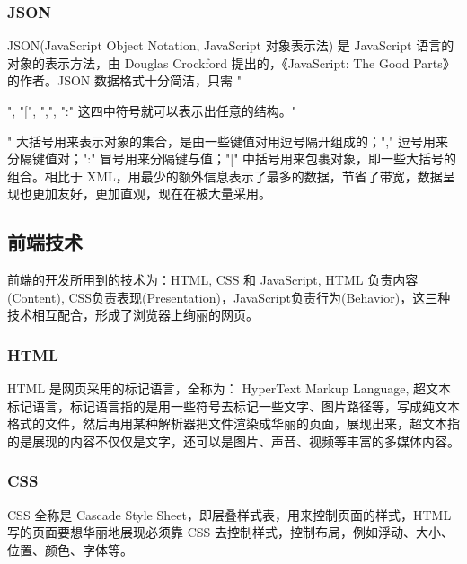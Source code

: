 \documentclass[UTF8]{ctexbook}
\begin{document}
            \subsubsection{JSON}
              \label{subsubsec:JSON}
                JSON(JavaScript Object Notation, JavaScript 对象表示法) 是 JavaScript 语言的对象的表示方法，由 Douglas Crockford 提出的，《JavaScript: The Good Parts》的作者。JSON 数据格式十分简洁，只需 "{", "[", ",", ":" 这四中符号就可以表示出任意的结构。"{" 大括号用来表示对象的集合，是由一些键值对用逗号隔开组成的；"," 逗号用来分隔键值对；":" 冒号用来分隔键与值；"[" 中括号用来包裹对象，即一些大括号的组合。相比于 XML，用最少的额外信息表示了最多的数据，节省了带宽，数据呈现也更加友好，更加直观，现在在被大量采用。

        \subsection{前端技术}
          \label{subsec:前端技术}
            前端的开发所用到的技术为：HTML, CSS 和 JavaScript, HTML 负责内容(Content), CSS负责表现(Presentation)，JavaScript负责行为(Behavior)，这三种技术相互配合，形成了浏览器上绚丽的网页。

            \subsubsection{HTML}
              \label{subsubsec:html}
                HTML 是网页采用的标记语言，全称为： HyperText Markup Language, 超文本标记语言，标记语言指的是用一些符号去标记一些文字、图片路径等，写成纯文本格式的文件，然后再用某种解析器把文件渲染成华丽的页面，展现出来，超文本指的是展现的内容不仅仅是文字，还可以是图片、声音、视频等丰富的多媒体内容。

            \subsubsection{CSS}
              \label{subsubsec:css}
                CSS 全称是 Cascade Style Sheet，即层叠样式表，用来控制页面的样式，HTML 写的页面要想华丽地展现必须靠 CSS 去控制样式，控制布局，例如浮动、大小、位置、颜色、字体等。

}}
\end{document}
